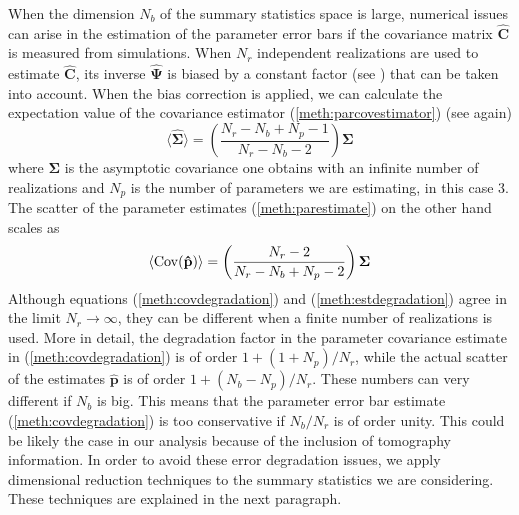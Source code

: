 \documentclass[reprint,aps,prd,superscriptaddress,showkeys,showpacs]{revtex4-1}
\newcommand{\bb}[1]{\mathbf{#1}}
\newcommand{\bbh}[1]{\mathbf{\hat{#1}}}
\begin{document}
When the dimension $N_b$ of the summary statistics space is large, numerical issues can arise in the estimation of the parameter error bars if the covariance matrix $\bbh{C}$ is measured from simulations. When $N_r$ independent realizations are used to estimate $\bbh{C}$, its inverse $\bbh{\Psi}$ is biased by a constant factor (see \citep{Hartlap07,Taylor12,Taylor14}) that can be taken into account. When the bias correction is applied, we can calculate the expectation value of the covariance estimator (\ref{meth:parcovestimator}) (see again\citep{Taylor14})
\begin{equation}
\label{meth:covdegradation}
\langle\bbh{\Sigma}\rangle = \left(\frac{N_r-N_b+N_p-1}{N_r-N_b-2}\right)\bb{\Sigma}
\end{equation}   
%
where $\bb{\Sigma}$ is the asymptotic covariance one obtains with an infinite number of realizations and $N_p$ is the number of parameters we are estimating, in this case 3. The scatter of the parameter estimates (\ref{meth:parestimate}) on the other hand scales as \citep{Taylor14}
\begin{equation}
\label{meth:estdegradation}
\langle{\rm Cov}(\bbh{p})\rangle = \left(\frac{N_r-2}{N_r-N_b+N_p-2}\right)\bb{\Sigma}
\end{equation}
%
Although equations (\ref{meth:covdegradation}) and (\ref{meth:estdegradation}) agree in the limit $N_r\rightarrow\infty$, they can be different when a finite number of realizations is used. More in detail, the degradation factor in the parameter covariance estimate in (\ref{meth:covdegradation}) is of order $1+(1+N_p)/N_r$, while the actual scatter of the estimates $\bbh{p}$ is of order $1+(N_b-N_p)/N_r$. These numbers can very different if $N_b$ is big. This means that the parameter error bar estimate (\ref{meth:covdegradation}) is too conservative if $N_b/N_r$ is of order unity. This could be likely the case in our analysis because of the inclusion of tomography information. In order to avoid these error degradation issues, we apply dimensional reduction techniques to the summary statistics we are considering. These techniques are explained in the next paragraph.   


\end{document}

